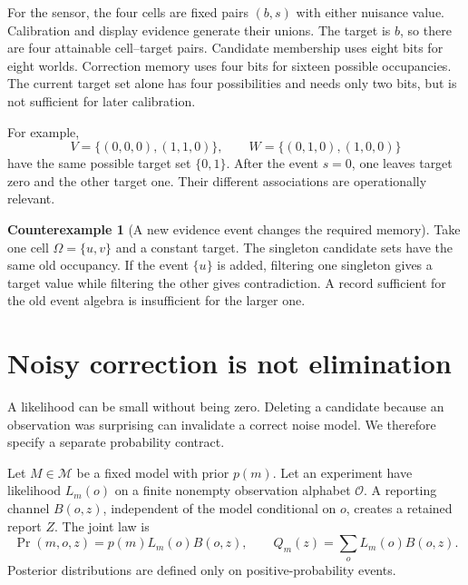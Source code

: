 \documentclass[11pt,oneside,openany]{book}
\theoremstyle{definition}\newtheorem{definition}[theorem]{Definition}
\newtheorem{counterexample}[theorem]{Counterexample}
\begin{document}
For the sensor, the four cells are fixed pairs $(b,s)$ with either nuisance value. Calibration and display evidence generate their unions. The target is $b$, so there are four attainable cell--target pairs. Candidate membership uses eight bits for eight worlds. Correction memory uses four bits for sixteen possible occupancies. The current target set alone has four possibilities and needs only two bits, but is not sufficient for later calibration.

For example,
\[
V=\{(0,0,0),(1,1,0)\},\qquad W=\{(0,1,0),(1,0,0)\}
\]
have the same possible target set $\{0,1\}$. After the event $s=0$, one leaves target zero and the other target one. Their different associations are operationally relevant.

\begin{counterexample}[A new evidence event changes the required memory]\label{ce:split}
Take one cell $\Omega=\{u,v\}$ and a constant target. The singleton candidate sets have the same old occupancy. If the event $\{u\}$ is added, filtering one singleton gives a target value while filtering the other gives contradiction. A record sufficient for the old event algebra is insufficient for the larger one.
\end{counterexample}

\section{Noisy correction is not elimination}
A likelihood can be small without being zero. Deleting a candidate because an observation was surprising can invalidate a correct noise model. We therefore specify a separate probability contract.

Let $M\in\mathcal M$ be a fixed model with prior $p(m)$. Let an experiment have likelihood $L_m(o)$ on a finite nonempty observation alphabet $\mathcal O$. A reporting channel $B(o,z)$, independent of the model conditional on $o$, creates a retained report $Z$. The joint law is
\[
\Pr(m,o,z)=p(m)L_m(o)B(o,z),\qquad Q_m(z)=\sum_oL_m(o)B(o,z).
\]
Posterior distributions are defined only on positive-probability events.
\end{document}
